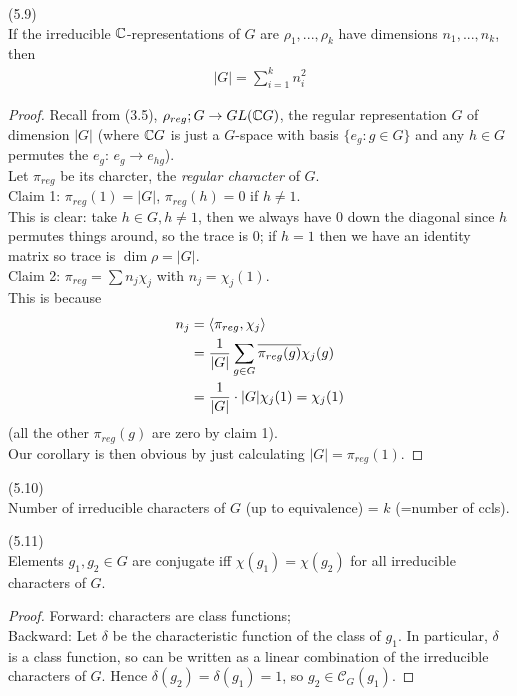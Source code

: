\documentclass[a4paper]{article}
\begin{document}
\begin{coro} (5.9)\\
If the irreducible $\mathbb{C}$-representations of $G$ are $\rho_1,...,\rho_k$ have dimensions $n_1,...,n_k$, then 
\begin{equation*}
\begin{aligned}
|G| = \sum_{i=1}^k n_i^2
\end{aligned}
\end{equation*}
\begin{proof}
Recall from (3.5), $\rho_{reg}; G \to GL(\mathbb{C} G)$, the regular representation $G$ of dimension $|G|$ (where $\mathbb{C} G$ is just a $G$-space with basis $\{e_g: g \in G\}$ and any $h \in G$ permutes the $e_g$: $e_g \to e_{hg}$).\\
Let $\pi_{reg}$ be its charcter, the \emph{regular character} of $G$.\\
Claim 1: $\pi_{reg}(1) = |G|$, $\pi_{reg}(h) = 0$ if $h \neq 1$.\\
This is clear: take $h \in G, h \neq 1$, then we always have $0$ down the diagonal since $h$ permutes things around, so the trace is 0; if $h=1$ then we have an identity matrix so trace is $\dim \rho = |G|$.\\
Claim 2: $\pi_{reg} = \sum n_j \chi_j$ with $n_j = \chi_j(1)$.\\
This is because
\begin{equation*}
\begin{aligned}
n_j &= \langle \pi_{reg}, \chi_j\rangle\\
&= \frac{1}{|G|} \sum_{g \in G} \overline{\pi_{reg}(g)} \chi_j(g)\\
&= \frac{1}{|G|} \cdot |G| \chi_j(1) = \chi_j(1)
\end{aligned}
\end{equation*}
(all the other $\pi_{reg}(g)$ are zero by claim 1).\\
Our corollary is then obvious by just calculating $|G| = \pi_{reg}(1)$.
\end{proof}
\end{coro}

\begin{coro} (5.10)\\
Number of irreducible characters of $G$ (up to equivalence) = $k$ (=number of ccls).
\end{coro}

\begin{coro} (5.11)\\
Elements $g_1,g_2 \in G$ are conjugate iff $\chi(g_1) = \chi(g_2)$ for all irreducible characters of $G$.
\begin{proof}
Forward: characters are class functions;\\
Backward: Let $\delta$ be the characteristic function of the class of $g_1$. In particular, $\delta$ is a class function, so can be written as a linear combination of the irreducible characters of $G$. Hence $\delta(g_2) = \delta(g_1) = 1$, so $g_2 \in \mathcal{C}_G (g_1)$.
\end{proof}
\end{coro}
\end{document}
